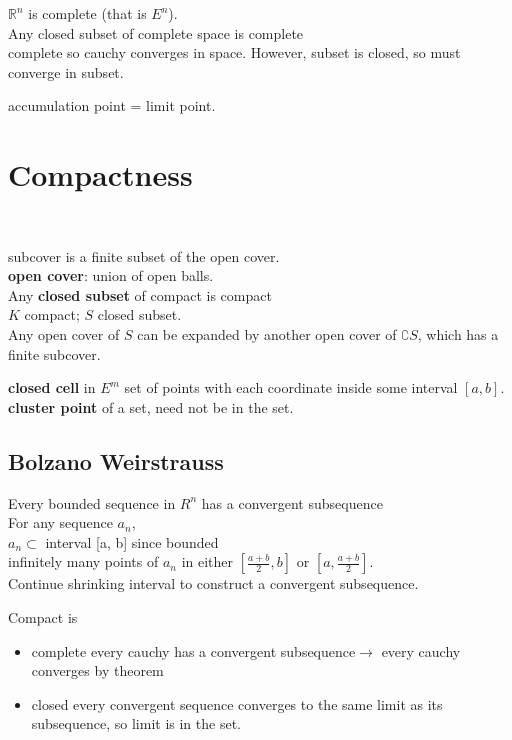 \documentclass[12pt]{article}
\begin{document}
\begin{itemize}
$\mathbb{R}^n$ is complete (that is $E^n$).\\

Any closed subset of complete space is complete\\
\textcolor[gray]{0.5}{complete so cauchy converges in space. However, subset is closed, so must converge in subset.\\}

accumulation point = limit point.\\


\section*{Compactness}
\\
\medskip

\noindent subcover is a finite subset of the open cover.\\
\textbf{open cover}: union of open balls.\\

\noindent Any \textbf{closed subset} of compact is compact\\
\textcolor[gray]{0.5}{$K$ compact; $S$ closed subset. \\
Any open cover of $S$ can be expanded by another open cover of $\complement S$, which has a finite subcover.\\}

\noindent \textbf{closed cell} in $E^m$ set of points with each coordinate inside some interval $[a, b]$.\\

\textbf{cluster point} of a set, need not be in the set.

\subsection*{Bolzano Weirstrauss}
Every bounded sequence in $R^n$ has a convergent subsequence\\

\textcolor[gray]{0.5}{
For any sequence $a_n$, \\
$a_n \subset$ interval [a, b] since bounded\\
infinitely many points of $a_n$ in either $[\frac{a+b}{2}, b]$ or $[a, \frac{a+b}{2}]$.\\
Continue shrinking interval to construct a convergent subsequence.
}

\bigskip

Compact is 
\begin{itemize}
    \item complete \textcolor[gray]{0.5}{every cauchy has a convergent subsequence$\rightarrow$ every cauchy converges by theorem}
    \item closed \textcolor[gray]{0.5}{every convergent sequence converges to the same limit as its subsequence, so limit is in the set.}
\end{itemize}


\end{itemize}
\end{document}
